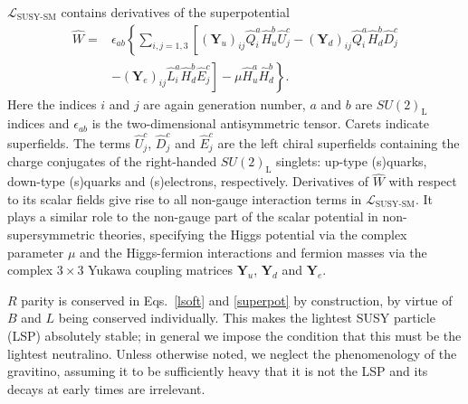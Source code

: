 \documentclass[pdftex,twocolumn,epjc3_preprint,runningheads]{svjour3}
\renewcommand{\_}{\discretionary{\underscore}{}{\underscore}}
\begin{document}
$\mathcal{L}_\textrm{SUSY-SM}$ contains derivatives of the superpotential
\begin{eqnarray}
\hat{W} =& \epsilon_{ab} \left\{ \textstyle\sum_{i,j=1,3} \left[(\mathbf{Y}_u)_{ij}\hat{Q}^a_i\hat{H}^b_u\hat{U}^c_j - (\mathbf{Y}_d)_{ij}\hat{Q}^a_i\hat{H}^b_d\hat{D}^c_j \right.\right. \nonumber\\
         & - \left.\left. (\mathbf{Y}_e)_{ij}\hat{L}^a_i\hat{H}^b_d\hat{E}^c_j\right] - \mu\hat{H}^a_u\hat{H}^b_d \right\}.
\label{superpot}
\end{eqnarray}
Here the indices $i$ and $j$ are again generation number, $a$ and $b$ are $SU(2)_\mathrm{L}$ indices and $\epsilon_{ab}$ is the two-dimensional antisymmetric tensor.  Carets indicate superfields.  The terms $\hat{U}^c_j$, $\hat{D}^c_j$ and $\hat{E}^c_j$ are the left chiral superfields containing the charge conjugates of the right-handed $SU(2)_\mathrm{L}$ singlets: up-type (s)quarks, down-type (s)quarks and (s)electrons, respectively.  Derivatives of $\hat{W}$ with respect to its scalar fields give rise to all non-gauge interaction terms in $\mathcal{L}_\textrm{SUSY-SM}$.  It plays a similar role to the non-gauge part of the scalar potential in non-supersymmetric theories, specifying the Higgs potential via the complex parameter $\mu$ and the Higgs-fermion interactions and fermion masses via the complex $3\times3$ Yukawa coupling matrices $\mathbf{Y}_u$, $\mathbf{Y}_d$ and $\mathbf{Y}_e$.

$R$ parity is conserved in Eqs.\ \ref{lsoft} and \ref{superpot} by construction, by virtue of $B$ and $L$ being conserved individually.  This makes the lightest SUSY particle (LSP) absolutely stable; in general we impose the condition that this must be the lightest neutralino.  Unless otherwise noted, we neglect the phenomenology of the gravitino, assuming it to be sufficiently heavy that it is not the LSP and its decays at early times are irrelevant.
\end{document}

